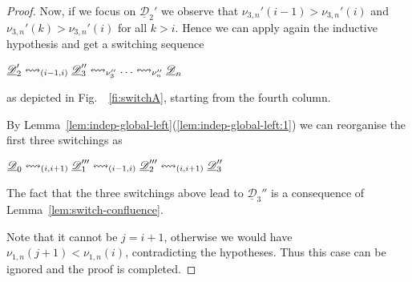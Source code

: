 \documentclass[a4paper,UKenglish,cleveref,pdftex,thm-restate,numberwithinsect]{lipics-v2021}
\newcommand{\dder}[1]{\mathscr{#1}}
\newcommand{\der}[1]{\underline{\dder{#1}}}
\newcommand{\shift}[1]{\ensuremath{\mathrel{{\leftrightsquigarrow}_{#1}}}}
\begin{document}
\begin{proof}
  Now, if we focus on $\der{D}_2'$ we observe that
  $\nu_{3,n}'(i-1) > \nu_{3,n}'(i)$ and
  $\nu_{3,n}'(k) > \nu_{3,n}'(i)$ for all $k > i$. Hence we can apply
  again the inductive hypothesis and get a switching sequence
    \begin{center}
    $\der{D}_2' \shift{\transp{i-1}[i]} \der{D}_3'' \shift{\nu_3''} \ldots
    \shift{\nu_n''} \der{D}_n$
  \end{center}
  as depicted in Fig.~~\ref{fi:switchA}, starting from the fourth column.

  By Lemma~\ref{lem:indep-global-left}(\ref{lem:indep-global-left:1})
  we can reorganise the first three switchings as

  \begin{center}
    $\der{D}_0 \shift{\transp{i}} \der{D}_1'''
    \shift{\transp{i-1}[i]} \der{D}_2'''
    \shift{\transp{i}} \der{D}_3''$
  \end{center}

  The fact that the three switchings above lead to $\der{D}_3''$ is a
  consequence of Lemma~\ref{lem:switch-confluence}.

  \bigskip

  Note that it cannot be $j=i+1$, otherwise we would have
  $\nu_{1,n}(j+1) < \nu_{1,n}(i)$, contradicting the hypotheses. Thus
  this case can be ignored and the proof is completed.  
\end{proof}
 
\end{document}
